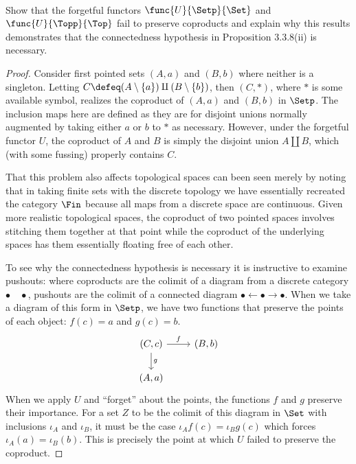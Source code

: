 \documentclass[../../main]{subfiles}
\begin{document}
\paragraph{}
\begin{exercise}
	Show that the forgetful functors \(\func{U}{\Setp}{\Set}\) and
	\(\func{U}{\Topp}{\Top}\) fail to preserve coproducts and explain why this
	results demonstrates that the connectedness hypothesis in Proposition
	3.3.8(ii) is necessary.
\end{exercise}

\begin{proof}
	Consider first pointed sets \((A,a)\) and \((B,b)\) where neither is a
	singleton. Letting \(C\defeq (A\setminus\{a\})\amalg(B\setminus\{b\})\),
	then \((C,*)\), where \(*\) is some available symbol, realizes the coproduct
	of \((A,a)\) and \((B,b)\) in \(\Setp\). The inclusion maps here are defined
	as they are for disjoint unions normally augmented by taking either \(a\) or
	\(b\) to \(*\) as necessary. However, under the forgetful functor \(U\), the
	coproduct of \(A\) and \(B\) is simply the disjoint union \(A\amalg B\),
	which (with some fussing) properly contains \(C\).

	That this problem also affects topological spaces can been seen merely by
	noting that in taking finite sets with the discrete topology we have
	essentially recreated the category \(\Fin\) because all maps from a discrete
	space are continuous. Given more realistic topological spaces, the coproduct
	of two pointed spaces involves stitching them together at that point while
	the coproduct of the underlying spaces has them essentially floating free of
	each other.

	To see why the connectedness hypothesis is necessary it is instructive to
	examine pushouts: where coproducts are the colimit of a diagram from a
	discrete category \(\bullet\quad\bullet\), pushouts are the colimit of a
	connected diagram \(\bullet\gets\bullet\to\bullet\). When we take a diagram
	of this form in \(\Setp\), we have two functions that preserve the points of
	each object: \(f(c)=a\) and \(g(c)=b\).
	\begin{equation*}\begin{tikzcd}
			(C,c) \ar[r, "f"] \ar[d, "g"] & (B,b) \\
			(A,a)
	\end{tikzcd}\end{equation*}
	When we apply \(U\) and ``forget'' about the points, the functions \(f\) and
	\(g\) preserve their importance. For a set \(Z\) to be the colimit of this
	diagram in \(\Set\) with inclusions \(\iota_A\) and \(\iota_B\), it must be
	the case \(\iota_Af(c)=\iota_Bg(c)\) which forces \(\iota_A(a)=\iota_B(b)\).
	This is precisely the point at which \(U\) failed to preserve the coproduct.

\end{proof}
\end{document}
